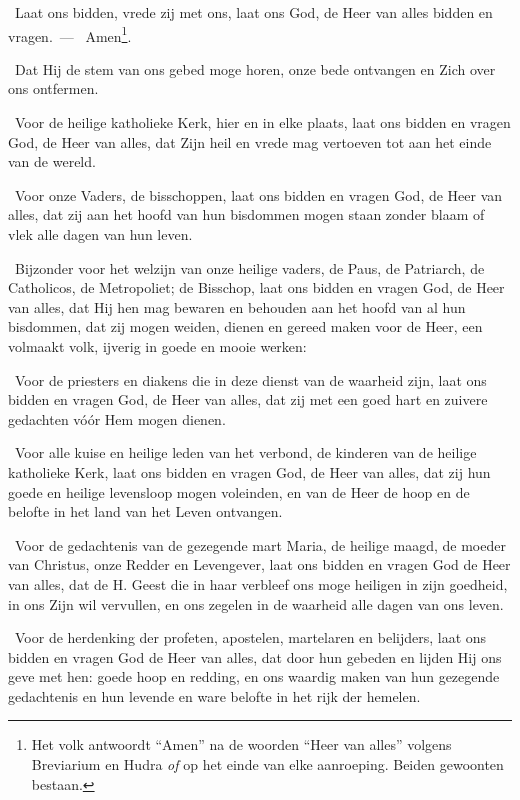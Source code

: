 \documentclass[12pt,twoside,a5paper]{article}
\begin{document}
\begin{halfparskip}
  \dd~Laat ons bidden, vrede zij met ons, laat ons God, de Heer van alles bidden en vragen.~--- \rr~Amen\footnote{Het volk antwoordt ``Amen'' na de woorden ``Heer van alles'' volgens Breviarium en Hudra \emph{of} op het einde van elke aanroeping. Beiden gewoonten bestaan.}.

  \dd~Dat Hij de stem van ons gebed moge horen, onze bede ontvangen en Zich over ons ontfermen.

  \dd~Voor de heilige katholieke Kerk, hier en in elke plaats, laat ons bidden en vragen God, de Heer van alles, dat Zijn heil en vrede mag vertoeven tot aan het einde van de wereld.

  \dd~Voor onze Vaders, de bisschoppen, laat ons bidden en vragen God, de Heer van alles, dat zij aan het hoofd van hun bisdommen mogen staan zonder blaam of vlek alle dagen van hun leven.

  \dd~Bijzonder voor het welzijn van onze heilige vaders, de Paus, de Patriarch, de Catholicos, de Metropoliet; de Bisschop, laat ons bidden en vragen God, de Heer van alles, dat Hij hen mag bewaren en behouden aan het hoofd van al hun bisdommen, dat zij mogen weiden, dienen en gereed maken voor de Heer, een volmaakt volk, ijverig in goede en mooie werken:

  \dd~Voor de priesters en diakens die in deze dienst van de waarheid zijn, laat ons bidden en vragen God, de Heer van alles, dat zij met een goed hart en zuivere gedachten vóór Hem mogen dienen.

  \dd~Voor alle kuise en heilige leden van het verbond, de kinderen van de heilige katholieke Kerk, laat ons bidden en vragen God, de Heer van alles, dat zij hun goede en heilige levensloop mogen voleinden, en van de Heer de hoop en de belofte in het land van het Leven ontvangen.

  \dd~Voor de gedachtenis van de gezegende mart Maria, de heilige maagd, de moeder van Christus, onze Redder en Levengever, laat ons bidden en vragen God de Heer van alles, dat de H. Geest die in haar verbleef ons moge heiligen in zijn goedheid, in ons Zijn wil vervullen, en ons zegelen in de waarheid alle dagen van ons leven.

  \dd~Voor de herdenking der profeten, apostelen, martelaren en belijders, laat ons bidden en vragen God de Heer van alles, dat door hun gebeden en lijden Hij ons geve met hen: goede hoop en redding, en ons waardig maken van hun gezegende gedachtenis en hun levende en ware belofte in het rijk der hemelen.


\end{halfparskip}
\end{document}
